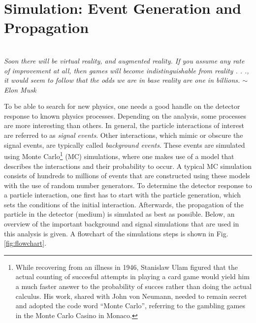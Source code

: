 \chapter{Simulation: Event Generation and Propagation}
\label{ch:simulation}
\begin{flushright}
\textit{\\Soon there will be virtual reality, and augmented reality. If you assume any rate of improvement at all, then games will become indistinguishable from reality . . ., it would seem to follow that the odds we are in base reality are one in billions. $\sim$ Elon Musk\\}
\end{flushright}
To be able to search for new physics, one needs a good handle on the detector response to known physics processes. Depending on the analysis, some processes are more interesting than others. In general, the particle interactions of interest are referred to as \textit{signal events}. Other interactions, which mimic or obscure the signal events, are typically called \textit{background events}. These events are simulated using Monte Carlo\footnote{While recovering from an illness in 1946, Stanislaw Ulam figured that the actual counting of succesful attempts in playing a card game would yield him a much faster answer to the probability of succes rather than doing the actual calculus. His work, shared with John von Neumann, needed to remain secret and adopted the code word ``Monte Carlo'', referring to the gambling games in the Monte Carlo Casino in Monaco.} (MC) simulations, where one makes use of a model that describes the interactions and their probability to occur. A typical MC simulation consists of hundreds to millions of events that are constructed using these models with the use of random number generators. To determine the detector response to a particle interaction, one first has to start with the particle generation, which sets the conditions of the initial interaction. Afterwards, the propagation of the particle in the detector (medium) is simulated as best as possible. Below, an overview of the important background and signal simulations that are used in this analysis is given. A flowchart of the simulations steps is shown in Fig. \ref{fig:flowchart}.

